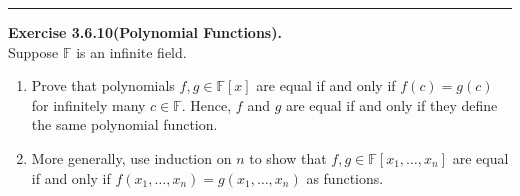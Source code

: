 \documentclass[a4paper, 12pt]{article}
\newenvironment{problem}[2][Exercise]
    { \begin{mdframed}[backgroundcolor=gray!20] \textbf{#1 #2} \\}
    {  \end{mdframed}}
\begin{document}
\noindent\rule{7in}{2.8pt}
\begin{problem}{3.6.10(Polynomial Functions).}
Suppose \(\mathbb{F}\) is an infinite field.
\begin{enumerate}[(1)]
	\item Prove that polynomials \(f,g\in \mathbb{F}[x]\) are equal if and only if \(f(c)=g(c)\) for infinitely many \(c\in \mathbb{F}\). Hence, \(f\) and \(g\) are equal if and only if 
	      they define the same polynomial function.
	\item More generally, use induction on \(n\) to show that \(f,g\in \mathbb{F}[x_1,\ldots,x_n]\) are equal if and only if \(f(x_1,\ldots,x_n)=g(x_1,\ldots,x_n)\) as functions.
\end{enumerate}
\end{problem}
\end{document}
